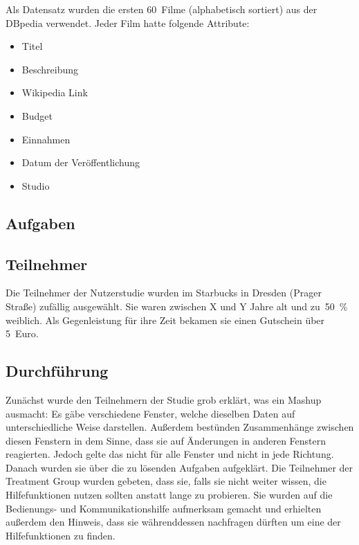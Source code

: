 \documentclass[
	headsepline,
	footsepline,
	fontsize=12pt,
	bibliography=totoc
]{scrbook}
\begin{document}
Als Datensatz wurden die ersten 60~Filme (alphabetisch sortiert) aus der DBpedia verwendet. Jeder Film hatte folgende Attribute:

\begin{itemize}
	\item Titel
	\item Beschreibung
	\item Wikipedia Link
	\item Budget
	\item Einnahmen
	\item Datum der Veröffentlichung
	\item Studio
\end{itemize}

\subsection{Aufgaben}




\subsection{Teilnehmer}

Die Teilnehmer der Nutzerstudie wurden im Starbucks in Dresden (Prager Straße) zufällig ausgewählt.  Sie waren zwischen X und Y Jahre alt und zu~50~\% weiblich. Als Gegenleistung für ihre Zeit bekamen sie einen Gutschein über 5~Euro.


\subsection{Durchführung}

Zunächst wurde den Teilnehmern der Studie grob erklärt, was ein Mashup ausmacht: Es gäbe verschiedene Fenster, welche dieselben Daten auf unterschiedliche Weise darstellen. Außerdem bestünden Zusammenhänge zwischen diesen Fenstern in dem Sinne, dass sie auf Änderungen in anderen Fenstern reagierten. Jedoch gelte das nicht für alle Fenster und nicht in jede Richtung. Danach wurden sie über die zu lösenden Aufgaben aufgeklärt. Die Teilnehmer der Treatment Group wurden gebeten, dass sie, falls sie nicht weiter wissen, die Hilfefunktionen nutzen sollten anstatt lange zu probieren. Sie wurden auf die Bedienungs- und Kommunikationshilfe aufmerksam gemacht und erhielten außerdem den Hinweis, dass sie währenddessen nachfragen dürften um eine der Hilfefunktionen zu finden.
\end{document}
